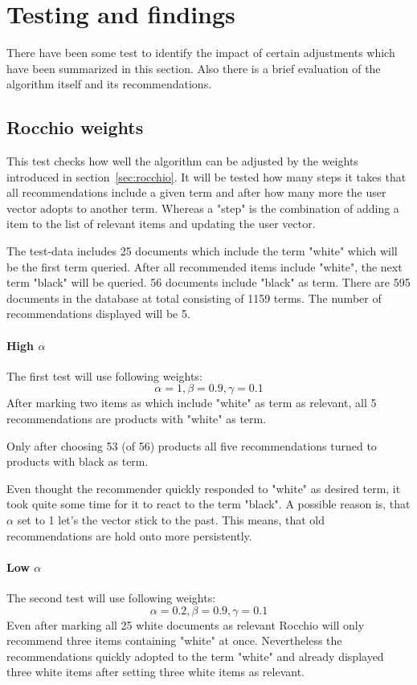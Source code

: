 
\section{Testing and findings}
\label{sec:testing-findings}
There have been some test to identify the impact of certain adjustments which have been summarized in this section.
Also there is a brief evaluation of the algorithm itself and its recommendations.


\subsection{Rocchio weights}
\label{sec:rocchio-weights}
This test checks how well the algorithm can be adjusted by the weights introduced in section~\ref{sec:rocchio}.
It will be tested how many steps it takes that all recommendations include a given term and after how many more the user vector adopts to another term.
Whereas a "step" is the combination of adding a item to the list of relevant items and updating the user vector.

The test-data includes 25 documents which include the term "white" which will be the first term queried.
After all recommended items include "white", the next term "black" will be queried.
56 documents include "black" as term.
There are 595 documents in the database at total consisting of 1159 terms.
The number of recommendations displayed will be 5.
\\

\paragraph{High $\alpha$}
The first test will use following weights:
$$\alpha = 1, \beta = 0.9, \gamma = 0.1$$
After marking two items as which include "white" as term as relevant, all 5 recommendations are products with "white" as term.

Only after choosing 53 (of 56) products all five recommendations turned to products with black as term.

Even thought the recommender quickly responded to "white" as desired term, it took quite some time for it to react to the term "black".
A possible reason is, that $\alpha$ set to 1 let's the vector stick to the past.
This means, that old recommendations are hold onto more persistently.
\\

\paragraph{Low $\alpha$}
The second test will use following weights:
$$\alpha = 0.2, \beta = 0.9, \gamma = 0.1$$
Even after marking all 25 white documents as relevant Rocchio will only recommend three items containing "white" at once.
Nevertheless the recommendations quickly adopted to the term "white" and already displayed three white items after setting three white items as relevant.

